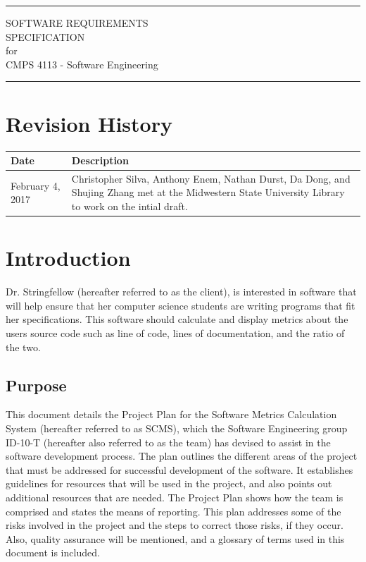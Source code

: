\documentclass{scrreprt}
\author{Christopher Silva}
\date{}
\def\myversion{0.1 }
\begin{document}
	\begin{titlepage}
		\flushright
		\rule{16cm}{5pt}\vskip1cm
		\Huge{SOFTWARE REQUIREMENTS\\ SPECIFICATION}\\
		\vspace{2cm}
		for\\
		\vspace{2cm}
		CMPS 4113 - Software Engineering\\
		\vspace{2cm}
		\vfill
		\rule{16cm}{5pt}
	\end{titlepage}
	\tableofcontents
	\chapter*{Revision History}
	\begin{tabular}{|p{3cm}|p{11cm}|}
		\hline 
		Date & Description \\ 
		\hline 
		February 4, 2017 & Christopher Silva, Anthony Enem, Nathan Durst, Da Dong, and Shujing Zhang met at the Midwestern State University Library to work on the intial draft. \\ 
		\hline 
	\end{tabular} 
	\chapter{Introduction}
	Dr. Stringfellow (hereafter referred to as the client), is interested in software that will help ensure that her computer science students are writing programs that fit her specifications. This software should calculate and display metrics about the users source code such as line of code, lines of documentation, and the ratio of the two.
	\section{Purpose}
	This document details the Project Plan for the Software Metrics Calculation System (hereafter referred to as SCMS), which the Software Engineering group ID-10-T (hereafter also referred to as the team) has devised to assist in the software development process. The plan outlines the different areas of the project that must be addressed for successful development of the software. It establishes guidelines for resources that will be used in the project, and also points out additional resources that are needed. The Project Plan shows how the team is comprised and states the means of reporting. This plan addresses some of the risks involved in the project and the steps to correct those risks, if they occur. Also, quality assurance will be mentioned, and a glossary of terms used in this document is included.
\end{document}

